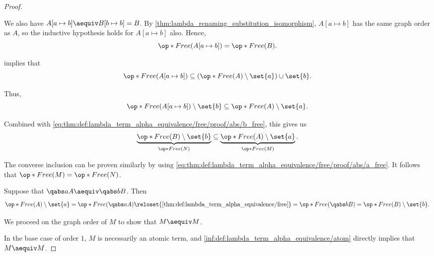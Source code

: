 \begin{proof}
\begin{itemize}
    We also have \( A[a \mapsto b] \aequiv B[b \mapsto b] = B \). By \cref{thm:lambda_renaming_substitution_isomorphism}, \( A[a \mapsto b] \) has the same graph order as \( A \), so the inductive hypothesis holds for \( A[a \mapsto b] \) also. Hence,
    \begin{equation}\label{eq:thm:def:lambda_term_alpha_equivalence/free/proof/abs/b_free}
      \op*{Free}(A[a \mapsto b]) = \op*{Free}(B).
    \end{equation}

     implies that
    \begin{equation*}
      \op*{Free}(A[a \mapsto b]) \subseteq (\op*{Free}(A) \setminus \set{ a }) \cup \set{ b }.
    \end{equation*}

    Thus,
    \begin{equation*}
      \op*{Free}(A[a \mapsto b]) \setminus \set{ b } \subseteq \op*{Free}(A) \setminus \set{ a }.
    \end{equation*}

    Combined with \eqref{eq:thm:def:lambda_term_alpha_equivalence/free/proof/abs/b_free}, this gives us
    \begin{equation*}
      \underbrace{\op*{Free}(B) \setminus \set{ b }}_{\op*{Free}(N)} \subseteq \underbrace{\op*{Free}(A) \setminus \set{ a }}_{\op*{Free}(M)}.
    \end{equation*}

    The converse inclusion can be proven similarly by using \eqref{eq:thm:def:lambda_term_alpha_equivalence/free/proof/abs/a_free}. It follows that \( \op*{Free}(M) = \op*{Free}(N) \).
  \end{itemize}

   Suppose that \( \qabs a A \aequiv \qabs b B \). Then
  \begin{equation*}
    \op*{Free}(A) \setminus \set{ a }
    =
    \op*{Free}(\qabs a A)
    \reloset {\ref{thm:def:lambda_term_alpha_equivalence/free}} =
    \op*{Free}(\qabs b B)
    =
    \op*{Free}(B) \setminus \set{ b }.
  \end{equation*}


   We proceed on the graph order of \( M \) to show that \( M \aequiv M \).

  In the base case of order \( 1 \), \( M \) is necessarily an atomic term, and \ref{inf:def:lambda_term_alpha_equivalence/atom} directly implies that \( M \aequiv M \).


\end{proof}

